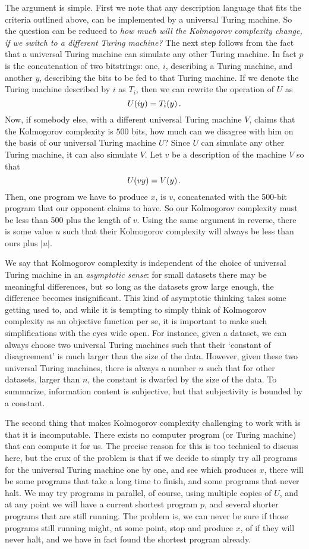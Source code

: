 The argument is simple. First we note that any description language that fits the criteria outlined above, can be implemented by a universal Turing machine. So the question can be reduced to \emph{how much will the Kolmogorov complexity change, if we switch to a different Turing machine?} The next step follows from the fact that a universal Turing machine can simulate any other Turing machine. In fact $p$ is the concatenation of two bitstrings: one, $i$, describing a Turing machine, and another $y$, describing the bits to be fed to that Turing machine. If we denote the Turing machine described by $i$ as $T_i$, then we can rewrite the operation of $U$ as 
\[
U(iy) = T_i(y) \,\text{.}
\]
Now, if somebody else, with a different universal Turing machine $V$, claims that the Kolmogorov complexity is $500$ bits, how much can we disagree with him on the basis of our universal Turing machine $U$? Since $U$ can simulate any other Turing machine, it can also simulate $V$. Let $v$ be a description of the machine $V$ so that 
\[
U(vy) = V(y) \,\text{.}
\]
Then, one program we have to produce $x$, is $v$, concatenated with the 500-bit program that our opponent claims to have. So our Kolmogorov complexity must be less than 500 plus the length of $v$. Using the same argument in reverse, there is some value $u$ such that their Kolmogorov complexity will always be less than ours plus $|u|$. 

We say that Kolmogorov complexity is independent of the choice of universal Turing machine in an \emph{asymptotic sense}: for small datasets there may be meaningful differences, but so long as the datasets grow large enough, the difference becomes insignificant. This kind of asymptotic thinking takes some getting used to, and while it is tempting to simply think of Kolmogorov complexity as an objective function per se, it is important to make such simplifications with the eyes wide open. For instance, given a dataset, we can always choose two universal Turing machines such that their `constant of disagreement' is much larger than the size of the data. However, given these two universal Turing machines, there is always a number $n$ such that for other datasets, larger than $n$, the constant is dwarfed by the size of the data. To summarize, information content is subjective, but that subjectivity is bounded by a constant. 

The second thing that makes Kolmogorov complexity challenging to work with is that it is incomputable. There exists no computer program (or Turing machine) that can compute it for us. The precise reason for this is too technical to discuss here, but the crux of the problem is that if we decide to simply try all programs for the universal Turing machine one by one, and see which produces $x$, there will be some programs that take a long time to finish, and some programs that never halt. We may try programs in parallel, of course, using multiple copies of $U$, and at any point we will have a current shortest program $p$, and several shorter programs that are still running. The problem is, we can never be sure if those programs still running might, at some point, stop and produce $x$, of if they will never halt, and we have in fact found the shortest program already. 

